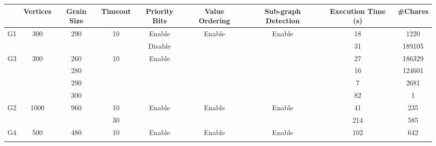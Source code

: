 \documentclass[10pt,twoside]{article}
\begin{document}
\begin{table}[h]
  \scalebox{0.8} {
    \begin{tabular}{|c|c|c|c|c|c|c|c|c|}
    \hline
                        & Vertices              & Grain Size           & Timeout             & Priority Bits           & Value Ordering          & Sub-graph Detection     & Execution Time (s) & \#Chares \\ \hline
    \multirow{2}{*}{G1} & \multirow{2}{*}{300}  & \multirow{2}{*}{290} & \multirow{2}{*}{10} & Enable                  & \multirow{2}{*}{Enable} & \multirow{2}{*}{Enable} & 18                 & 1220     \\ \cline{5-5} \cline{8-9} 
                        &                       &                      &                     & Disable                 &                         &                         & 31                 & 189105   \\ \hline
    \multirow{4}{*}{G3} & \multirow{4}{*}{300}  & 260                  & \multirow{4}{*}{10} & \multirow{4}{*}{Enable} & \multirow{4}{*}{}       & \multirow{4}{*}{}       & 27                 & 186329   \\ \cline{3-3} \cline{8-9} 
                        &                       & 280                  &                     &                         &                         &                         & 16                 & 124601   \\ \cline{3-3} \cline{8-9} 
                        &                       & 290                  &                     &                         &                         &                         & 7                  & 2681     \\ \cline{3-3} \cline{8-9} 
                        &                       & 300                  &                     &                         &                         &                         & 82                 & 1        \\ \hline
    \multirow{2}{*}{G2} & \multirow{2}{*}{1000} & \multirow{2}{*}{960} & 10                  & \multirow{2}{*}{Enable} & \multirow{2}{*}{Enable} & \multirow{2}{*}{Enable} & 41                 & 235      \\ \cline{4-4} \cline{8-9} 
                        &                       &                      & 30                  &                         &                         &                         & 214                & 585      \\ \hline
    \multirow{2}{*}{G4} & \multirow{2}{*}{500}  & \multirow{2}{*}{480} & \multirow{2}{*}{10} & \multirow{2}{*}{Enable} & Enable                  & \multirow{2}{*}{Enable} & 102                & 642      \\ \cline{6-6} \cline{8-9} 

\end{tabular}}
\end{table}
\end{document}
